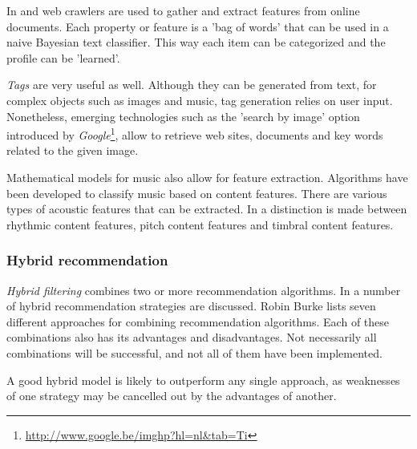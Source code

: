 In \cite{bostandjiev:2012} and \cite{melville:2002:CCF:777092.777124} web crawlers are used to gather and extract features from online documents. Each property or feature is a 'bag of words' that can be used in a naive Bayesian text classifier. This way each item can be categorized and the profile can be 'learned'\cite{melville:2002:CCF:777092.777124}.

\emph{Tags} are very useful as well. Although they can be generated from text, for complex objects such as images and music, tag generation relies on user input\cite{rajaraman:2012}. Nonetheless, emerging technologies such as the 'search by image' option introduced by \emph{Google}\footnote{\url{http://www.google.be/imghp?hl=nl&tab=Ti}}, allow to retrieve web sites, documents and key words related to the given image\cite{google:2011:afbeeldingen}.

Mathematical models for music also allow for feature extraction. Algorithms have been developed to classify music based on content features\cite{Li:2006:TIM:2219090.2219562, tzanetakis:2002}. There are various types of acoustic features that can be extracted. In \cite{Li:2006:TIM:2219090.2219562} a distinction is made between rhythmic content features, pitch content features and timbral content features.


\subsubsection{Hybrid recommendation}\label{chapter:literature_study:section:computer:subsection:algorithms:subsubsection:hf}

\emph{Hybrid filtering} combines two or more recommendation algorithms\cite{burke:2002}. In \cite{burke:2002} a number of hybrid recommendation strategies are discussed. Robin Burke lists seven different approaches for combining recommendation algorithms. Each of these combinations also has its advantages and disadvantages. Not necessarily all combinations will be successful, and not all of them have been implemented\cite{burke:2002}.

A good hybrid model is likely to outperform any single approach, as weaknesses of one strategy may be cancelled out by the advantages of another\cite{song:2012}.




